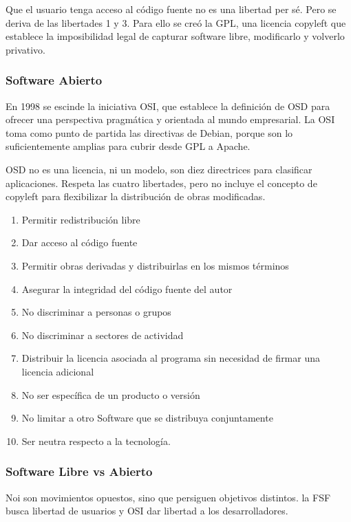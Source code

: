         Que el usuario tenga acceso al código fuente no es una libertad per sé. Pero se deriva de las libertades 1 y 3. Para ello se creó la GPL, una licencia copyleft que establece la imposibilidad legal de capturar software libre, modificarlo y volverlo privativo.

    \subsubsection{Software Abierto}
        En 1998 se escinde la iniciativa OSI, que establece la definición de OSD para ofrecer una perspectiva pragmática y orientada al mundo empresarial. La OSI toma como punto de partida las directivas de Debian, porque son lo suficientemente amplias para cubrir desde GPL a Apache.

        OSD no es una licencia, ni un modelo, son diez directrices para clasificar aplicaciones. Respeta las cuatro libertades, pero no incluye el concepto de copyleft para flexibilizar la distribución de obras modificadas.
        
        \begin{enumerate}
            \item Permitir redistribución libre
            \item Dar acceso al código fuente
            \item Permitir obras derivadas y distribuirlas en los mismos términos
            \item Asegurar la integridad del código fuente del autor
            \item No discriminar a personas o grupos
            \item No discriminar a sectores de actividad
            \item Distribuir la licencia asociada al programa sin necesidad de firmar una licencia adicional
            \item No ser específica de un producto o versión
            \item No limitar a otro Software que se distribuya conjuntamente
            \item Ser neutra respecto a la tecnología.
        \end{enumerate}

    \subsubsection{Software Libre vs Abierto}
        Noi son movimientos opuestos, sino que persiguen objetivos distintos. la FSF busca libertad de usuarios y OSI dar libertad a los desarrolladores.

